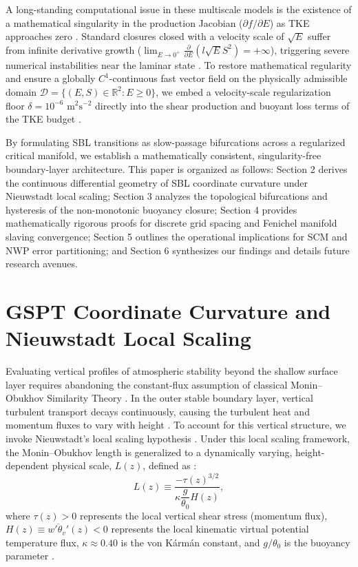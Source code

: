 \documentclass[draft,11pt,twocolumn]{article}
\theoremstyle{definition}
\theoremstyle{remark}
\begin{document}
A long-standing computational issue in these multiscale models is the existence of a mathematical singularity in the production Jacobian ($\partial f / \partial E$) as TKE approaches zero \cite{CoreMathRevisions}. Standard closures closed with a velocity scale of $\sqrt{E}$ suffer from infinite derivative growth ($\lim_{E \to 0^+} \frac{\partial}{\partial E}(l\sqrt{E}S^2) = +\infty$), triggering severe numerical instabilities near the laminar state \cite{CoreMathRevisions}. To restore mathematical regularity and ensure a globally $C^1$-continuous fast vector field on the physically admissible domain $\mathcal{D} = \{ (E, S) \in \mathbb{R}^2 : E \ge 0 \}$, we embed a velocity-scale regularization floor $\delta = 10^{-6}\text{ m}^2\text{s}^{-2}$ directly into the shear production and buoyant loss terms of the TKE budget \cite{BelowFastSlow, CoreMathRevisions}.

By formulating SBL transitions as slow-passage bifurcations across a regularized critical manifold, we establish a mathematically consistent, singularity-free boundary-layer architecture. This paper is organized as follows: Section 2 derives the continuous differential geometry of SBL coordinate curvature under Nieuwstadt local scaling; Section 3 analyzes the topological bifurcations and hysteresis of the non-monotonic buoyancy closure; Section 4 provides mathematically rigorous proofs for discrete grid spacing and Fenichel manifold slaving convergence; Section 5 outlines the operational implications for SCM and NWP error partitioning; and Section 6 synthesizes our findings and details future research avenues.

\section{GSPT Coordinate Curvature and Nieuwstadt Local Scaling}

Evaluating vertical profiles of atmospheric stability beyond the shallow surface layer requires abandoning the constant-flux assumption of classical Monin--Obukhov Similarity Theory \cite{sheba2002}. In the outer stable boundary layer, vertical turbulent transport decays continuously, causing the turbulent heat and momentum fluxes to vary with height \cite{grachev2007, sheba2002}. To account for this vertical structure, we invoke Nieuwstadt's local scaling hypothesis \cite{STABILITY}. Under this local scaling framework, the Monin--Obukhov length is generalized to a dynamically varying, height-dependent physical scale, $L(z)$, defined as \cite{STABILITY}:
\begin{equation}
    L(z) \equiv \frac{-\tau(z)^{3/2}}{\kappa \dfrac{g}{\theta_0} H(z)}, \label{eq:local_obukhov_length}
\end{equation}
where $\tau(z) > 0$ represents the local vertical shear stress (momentum flux), $H(z) \equiv \overline{w'\theta_v'}(z) < 0$ represents the local kinematic virtual potential temperature flux, $\kappa \approx 0.40$ is the von K\'arm\'an constant, and $g/\theta_0$ is the buoyancy parameter \cite{STABILITY}.
\end{document}
